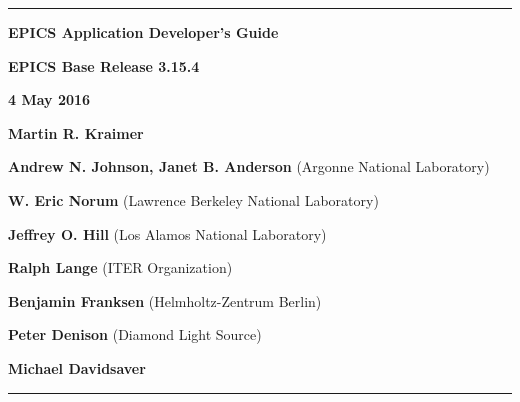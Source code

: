 \hrule

\vspace{1in}

\noindent \Huge \textbf{EPICS Application Developer's Guide}

\vspace{0.5in}

\noindent \Large \textbf{EPICS Base Release 3.15.4}

\noindent \textbf{4 May 2016}

\vspace{0.5in}

\normalsize
\noindent \textbf{Martin R. Kraimer}

\noindent \textbf{Andrew N. Johnson, Janet B. Anderson} (Argonne National Laboratory)

\noindent \textbf{W. Eric Norum} (Lawrence Berkeley National Laboratory)

\noindent \textbf{Jeffrey O. Hill} (Los Alamos National Laboratory)

\noindent \textbf{Ralph Lange} (ITER Organization)

\noindent \textbf{Benjamin Franksen} (Helmholtz-Zentrum Berlin)

\noindent \textbf{Peter Denison} (Diamond Light Source)

\noindent \textbf{Michael Davidsaver}

\vspace{1in}
\hrule
